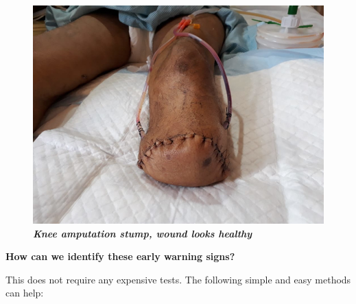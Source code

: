 \begin{figure}[h]
\centering
\includegraphics[scale=2.3]{images/062a.jpg}\\
\textbf{\textit{Knee amputation stump, wound looks healthy}}
\end{figure}

\noindent\textbf{How can we identify these early warning signs?}

This does not require any expensive tests. The following simple and easy methods can help:

